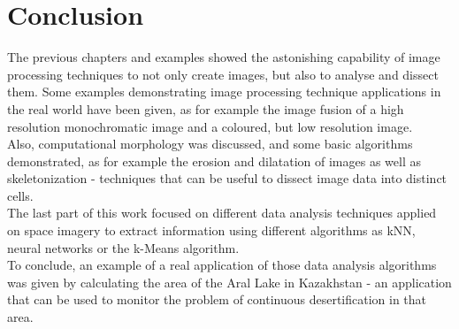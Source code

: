 \section{Conclusion}
The previous chapters and examples showed the astonishing capability of image processing techniques to not only create images, but also to analyse and dissect them.
Some examples demonstrating image processing technique applications in the real world have been given, as for example the image fusion of a high resolution monochromatic image and a coloured, but low resolution image.\\
Also, computational morphology was discussed, and some basic algorithms demonstrated, as for example the erosion and dilatation of images as well as skeletonization - techniques that can be useful to dissect image data into distinct cells.\\
The last part of this work focused on different data analysis techniques applied on space imagery to extract information using different algorithms as kNN, neural networks or the k-Means algorithm.\\
To conclude, an example of a real application of those data analysis algorithms was given by calculating the area of the Aral Lake in Kazakhstan - an application that can be used to monitor the problem of continuous desertification in that area.






